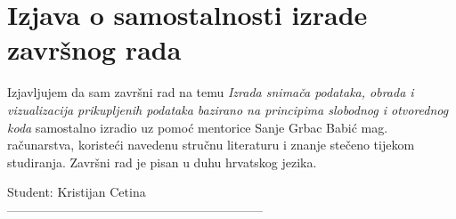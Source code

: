 \section*{Izjava o samostalnosti izrade završnog rada}
Izjavljujem da sam završni rad na temu \emph{Izrada snimača podataka, obrada i vizualizacija prikupljenih podataka bazirano na principima slobodnog i otvorednog koda} samostalno izradio uz pomoć mentorice Sanje Grbac Babić mag. računarstva, koristeći navedenu stručnu literaturu i znanje stečeno tijekom studiranja.
Završni rad je pisan u duhu hrvatskog jezika.
\vspace{\fill}
\begin{flushright}
Student: Kristijan Cetina\\
\vspace{15mm}
--------------------------------------------------------------
\end{flushright}